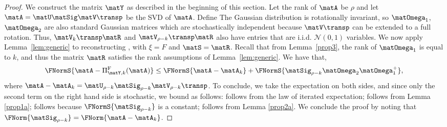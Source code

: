 \begin{proof}
We construct the matrix $\matY$ as described in the beginning of this section. Let the rank of $\matA$ be $\rho$ and let $\matA = \matU \matSig \matV\transp$ be the SVD of $\matA$. Define
The Gaussian distribution is rotationally invariant, so $\matOmega_1$, $\matOmega_2$ are also standard Gaussian matrices which are
stochastically independent because $\matV\transp$ can be
extended to a full rotation.
Thus, $\matV_{k}\transp \matR$ and $\matV_{\rho-k}\transp\matR$
also have entries that are i.i.d. $\mathcal{N}(0,1)$ variables.
We now apply Lemma~\ref{lem:generic} to
reconstructing \math{\matA}, with $\xi = F$ and $\matS = \matR$.
Recall that from Lemma~\ref{prop3}, the rank of $\matOmega_1$ is equal to $k$, and thus the matrix $\matR$ satisfies the rank assumptions
of Lemma~\ref{lem:generic}. We have that,
$$\FNormS{ \matA - \Pi_{\matY,k}^{\mathrm{F}}(\matA) } \le
\FNormS{\matA - \matA_k} + \FNormS{ \matSig_{\rho-k} \matOmega_2 \matOmega_1^+} ,$$
where
$\matA - \matA_k = \matU_{\rho-k}  \matSig_{\rho-k} \matV_{\rho-k}\transp$. To conclude, we take the expectation on both sides, and since only
the second term on the right hand side is stochastic, we bound as follows:
 follows from the law of iterated expectation;  follows from Lemma \ref{prop1a};  follows because $\FNormS{\matSig_{\rho-k}}$ is a constant;  follows from Lemma \ref{prop2a}. We conclude the proof by noting that $\FNorm{\matSig_{\rho-k}} = \FNorm{\matA - \matA_k}$.
\end{proof}



